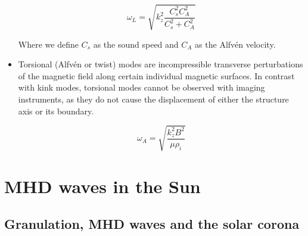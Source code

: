\documentclass[../main.tex]{subfiles}
\begin{document}
\begin{itemize}
\begin{equation*}
\omega_L=\sqrt{k_z^2\frac{C_s^2C_A^2}{C_s^2+C_A^2}}
\end{equation*}

Where we define $C_s$ as the sound speed and $C_{A}$ as the Alfvén velocity.

\item Torsional (Alfv\'en or twist) modes are incompressible transverse perturbations of the magnetic field along certain individual magnetic surfaces. In contrast with kink modes, torsional modes cannot be observed with imaging instruments, as they do not cause the displacement of either the structure axis or its boundary.

\begin{equation*}
\omega_{A}=\sqrt{\frac{k_{z}^{2}B^{2}}{\mu \rho _{i}}}
\end{equation*}

\end{itemize}

\chapter{MHD waves in the Sun}
\PartialToc

\section{Granulation, MHD waves and the solar corona}
\cite{alf47granulation}


\stopcontents[chapters]
\end{document}
